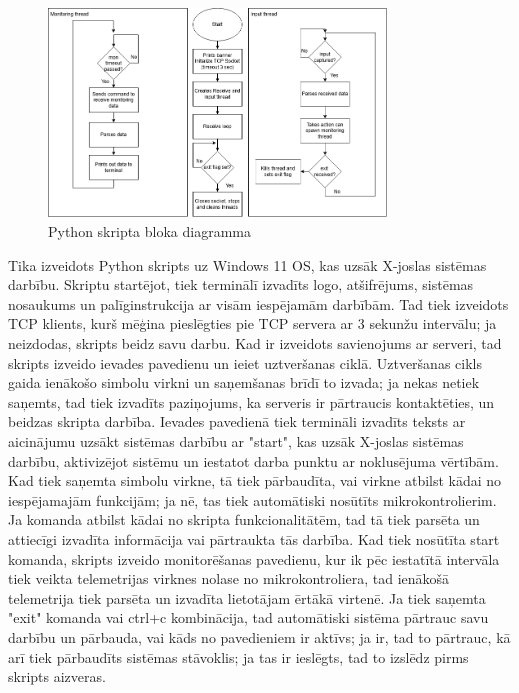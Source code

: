 \begin{figure}[H]
	\centering
    \includegraphics[width=0.8\textwidth]{pictures/script_program.drawio.png}\hspace{1cm}
    \caption{Python skripta bloka diagramma}
\end{figure}
Tika izveidots Python skripts uz Windows 11 OS, kas uzsāk X-joslas sistēmas darbību. Skriptu startējot, tiek terminālī izvadīts logo, atšifrējums, sistēmas nosaukums un palīginstrukcija ar visām iespējamām darbībām. Tad tiek izveidots TCP klients, kurš mēģina pieslēgties pie TCP servera ar 3 sekunžu intervālu; ja neizdodas, skripts beidz savu darbu. Kad ir izveidots savienojums ar serveri, tad skripts izveido ievades pavedienu un ieiet uztveršanas ciklā. Uztveršanas cikls gaida ienākošo simbolu virkni un saņemšanas brīdī to izvada; ja nekas netiek saņemts, tad tiek izvadīts paziņojums, ka serveris ir pārtraucis kontaktēties, un beidzas skripta darbība. Ievades pavedienā tiek termināli izvadīts teksts ar aicinājumu uzsākt sistēmas darbību ar "start", kas uzsāk X-joslas sistēmas darbību, aktivizējot sistēmu un iestatot darba punktu ar noklusējuma vērtībām. Kad tiek saņemta simbolu virkne, tā tiek pārbaudīta, vai virkne atbilst kādai no iespējamajām funkcijām; ja nē, tas tiek automātiski nosūtīts mikrokontrolierim. Ja komanda atbilst kādai no skripta funkcionalitātēm, tad tā tiek parsēta un attiecīgi izvadīta informācija vai pārtraukta tās darbība. Kad tiek nosūtīta start komanda, skripts izveido monitorēšanas pavedienu, kur ik pēc iestatītā intervāla tiek veikta telemetrijas virknes nolase no mikrokontroliera, tad ienākošā telemetrija tiek parsēta un izvadīta lietotājam ērtākā virtenē. Ja tiek saņemta "exit" komanda vai ctrl+c kombinācija, tad automātiski sistēma pārtrauc savu darbību un pārbauda, vai kāds no pavedieniem ir aktīvs; ja ir, tad to pārtrauc, kā arī tiek pārbaudīts sistēmas stāvoklis; ja tas ir ieslēgts, tad to izslēdz pirms skripts aizveras.